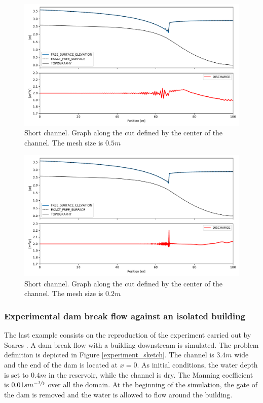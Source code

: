 \begin{figure}
    \centering
    \includegraphics[width=\textwidth]{img/eulerian/jump/mesh_0.5.pdf}
    \caption{Short channel. Graph along the cut defined by the center of the channel. The mesh size is $0.5m$}
    \label{mac_donald_shock_graph_5}
\end{figure}

\begin{figure}
    \centering
    \includegraphics[width=\textwidth]{img/eulerian/jump/mesh_0.2.pdf}
    \caption{Short channel. Graph along the cut defined by the center of the channel. The mesh size is $0.2m$}
    \label{mac_donald_shock_graph_2}
\end{figure}


\subsubsection{Experimental dam break flow against an isolated building}

The last example consists on the reproduction of the experiment carried out by Soares \cite{soares2007}.
A dam break flow with a building downstream is simulated. The problem definition is depicted in Figure \ref{experiment_sketch}. The channel is $3.4m$ wide and the end of the dam is located at $x=0$.
As initial conditions, the water depth is set to $0.4m$ in the reservoir, while the channel is dry. The Manning coefficient is $0.01sm^{-\sfrac{1}{3}}$ over all the domain.
At the beginning of the simulation, the gate of the dam is removed and the water is allowed to flow around the building.

